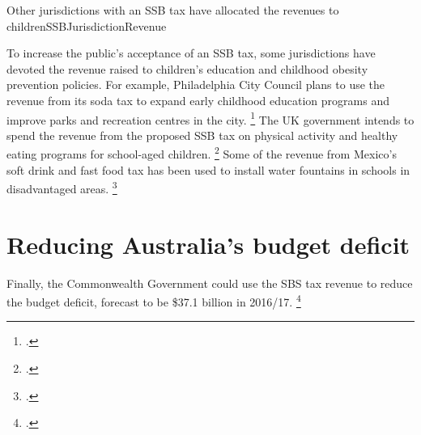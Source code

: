\documentclass[embargoed]{grattan}
\begin{document}
\begin{verysmallbox}{Other jurisdictions with an SSB tax have allocated the revenues to children}{SSBJurisdictionRevenue}

To increase the public's acceptance of an SSB tax, some jurisdictions have devoted the revenue raised to children's education and childhood obesity prevention policies.
For example, Philadelphia City Council plans to use the revenue from its soda tax to expand early childhood education programs and improve parks and recreation centres in the city.%
\footcite{Nadolny2016Sodataxpasses} The UK government intends to spend the revenue from the proposed SSB tax on physical activity and healthy eating programs for school-aged children.%
\footcite{HMTreasurysugarlevy} Some of the revenue from Mexico's soft drink and fast food tax has been used to install water fountains in schools in disadvantaged areas.%
\footcite{Soares2016Puttingtaxesdiet}
\end{verysmallbox}

\section{Reducing Australia's budget deficit}\label{reducing-australias-budget-deficit}

Finally, the Commonwealth Government could use the SBS tax revenue to reduce the budget deficit, forecast to be \$37.1 billion in 2016/17.%
\footcite{Treasury2016201617BudgetBudget}
\end{document}
